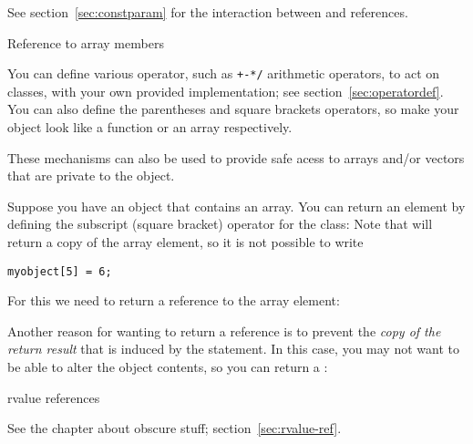 See section~\ref{sec:constparam} for the interaction between 
and references.

 {Reference to array members}
\label{sec:overloadbracket}

You can define various operator, such as \verb.+-*/. arithmetic
operators, to act on classes, with your own provided implementation;
see section~\ref{sec:operatordef}. You can also define the parentheses
and square brackets operators, so make your object look like a
function or an array respectively.

These mechanisms can also be used to provide safe acess to arrays
and/or vectors that are private to the object.

Suppose you have an object that contains an  array. You can
return an element by defining the subscript (square bracket) operator
for the class:
%
%
Note that  will return a copy of the array element,
so it is not possible to write
\begin{verbatim}
myobject[5] = 6;
\end{verbatim}
For this we need to return a reference to the array element:
%

Another reason for wanting to return a reference is to prevent the
\emph{copy of the return result}
that is induced by the  statement.
In this case, you may not want to be able to alter the object
contents, so you can return a :
%

 {rvalue references}

See the chapter about obscure stuff; section~\ref{sec:rvalue-ref}.
